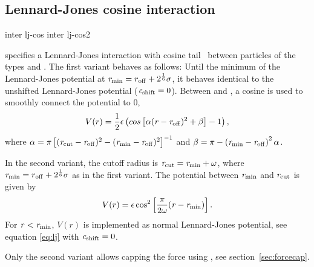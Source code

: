 \subsection{Lennard-Jones cosine interaction}
\begin{essyntax}
  inter   lj-cos
  \var{\epsilon} \var{\sigma}
   
  inter   lj-cos2
  \var{\epsilon} \var{\sigma} 
   \var{\omega}
  \begin{features}
  \end{features}
\end{essyntax}
specifies a Lennard-Jones interaction with cosine
tail~\cite{soddeman01a} between particles of the types  and
. The first variant behaves as follows: Until the minimum
of the Lennard-Jones potential at $\mathrm{\mathit{r_\mathrm{min}}} = r_\mathrm{off} +
2^{\frac{1}{6}}\sigma$, it behaves identical to the unshifted
Lennard-Jones potential ($\mathrm{\mathit{c_\mathrm{shift}}}=0$).  Between
 and , a cosine is used to
smoothly connect the potential to 0, \ie
\begin{equation}
  V(r)=\frac{1}{2}\epsilon\left(cos\left[\alpha(\mathrm{\mathit{r}}-\mathrm{\mathit{r_\mathrm{off}}})^2 + \beta\right]-1\right),
\end{equation}
where
$\alpha = \pi\left[(\mathrm{\mathit{r_\mathrm{cut}}}-\mathrm{\mathit{r_\mathrm{off}}})^2-(\mathrm{\mathit{r_\mathrm{min}}}-\mathrm{\mathit{r_\mathrm{off}}})^2\right]^{-1}$
and
$\beta = \pi - \left(\mathrm{\mathit{r_\mathrm{min}}}-\mathrm{\mathit{r_\mathrm{off}}}\right)^2\alpha$.

In the second variant, the cutoff radius is
$\mathrm{\mathit{r_\mathrm{cut}}}=\mathrm{\mathit{r_\mathrm{min}}} + \omega$, where $\mathrm{\mathit{r_\mathrm{min}}} =  r_\mathrm{off} +
2^{\frac{1}{6}}\sigma$ as in the first variant. The potential
between $\mathrm{\mathit{r_\mathrm{min}}}$ and $\mathrm{\mathit{r_\mathrm{cut}}}$ is given by
\begin{equation}
  V(r)=\epsilon\cos^2\left[\frac{\pi}{2\omega}(\mathrm{\mathit{r}} - \mathrm{\mathit{r_\mathrm{min}}})\right].
\end{equation}
For $\mathrm{\mathit{r}} < \mathrm{\mathit{r_\mathrm{min}}}$, $V(r)$ is implemented as normal Lennard-Jones potential, see equation \ref{eq:lj} with $\mathrm{\mathit{c_\mathrm{shift}}} = 0$.

Only the second variant allows capping the force using , see section~\ref{sec:forcecap}.

